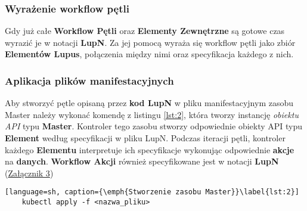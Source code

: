 \subsubsection{Wyrażenie workflow pętli}

Gdy już całe \textbf{Workflow Pętli} oraz \textbf{Elementy Zewnętrzne} są gotowe czas wyrazić je w notacji \textbf{LupN}. Za jej pomocą wyraża się workflow pętli jako zbiór  \textbf{Elementów Lupus}, połączenia między nimi oraz specyfikacja każdego z nich.

\subsubsection{Aplikacja plików manifestacyjnych}

Aby stworzyć pętle opisaną przez \textbf{kod LupN} w pliku manifestacyjnym zasobu Master należy wykonać komendę z listingu \ref{lst:2}, która tworzy instancję \textit{obiektu API} typu \textbf{Master}. Kontroler tego zasobu stworzy odpowiednie obiekty API typu \textbf{Element} według specyfikacji w pliku LupN. Podczas iteracji pętli, kontroler każdego \textbf{Elementu} interpretuje ich specyfikacje wykonując odpowiednie \textbf{akcje} na \textbf{danych}. \textbf{Workflow Akcji} również specyfikowane jest w notacji \textbf{LupN} (\hyperref[appendix:3]{Załącznik 3})

\begin{lstlisting}[language=sh, caption={\emph{Stworzenie zasobu Master}}\label{lst:2}]
    kubectl apply -f <nazwa_pliku>
\end{lstlisting}
